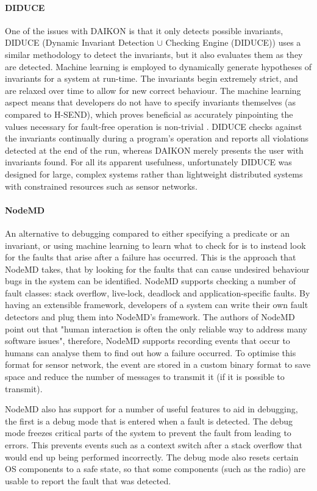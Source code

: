 \paragraph{DIDUCE} One of the issues with DAIKON is that it only detects possible invariants, DIDUCE \cite{diduce} (Dynamic Invariant Detection $\cup$ Checking Engine (DIDUCE)) uses a similar methodology to detect the invariants, but it also evaluates them as they are detected. Machine learning is employed to dynamically generate hypotheses of invariants for a system at run-time. The invariants begin extremely strict, and are relaxed over time to allow for new correct behaviour. The machine learning aspect means that developers do not have to specify invariants themselves (as compared to H-SEND), which proves beneficial as accurately pinpointing the values necessary for fault-free operation is non-trivial \cite{?}. DIDUCE checks against the invariants continually during a program's operation and reports all violations detected at the end of the run, whereas DAIKON merely presents the user with invariants found. For all its apparent usefulness, unfortunately DIDUCE was designed for large, complex systems rather than lightweight distributed systems with constrained resources such as sensor networks.

\paragraph{NodeMD} An alternative to debugging compared to either specifying a predicate or an invariant, or using machine learning to learn what to check for is to instead look for the faults that arise after a failure has occurred. This is the approach that NodeMD \cite{NodeMD} takes, that by looking for the faults that can cause undesired behaviour bugs in the system can be identified. NodeMD supports checking a number of fault classes: stack overflow, live-lock, deadlock and application-specific faults. By having an extensible framework, developers of a system can write their own fault detectors and plug them into NodeMD's framework. The authors of NodeMD point out that "human interaction is often the only reliable way to address many software issues", therefore, NodeMD supports recording events that occur to humans can analyse them to find out how a failure occurred. To optimise this format for sensor network, the event are stored in a custom binary format to save space and reduce the number of messages to transmit it (if it is possible to transmit).

NodeMD also has support for a number of useful features to aid in debugging, the first is a debug mode that is entered when a fault is detected. The debug mode freezes critical parts of the system to prevent the fault from leading to errors. This prevents events such as a context switch after a stack overflow that would end up being performed incorrectly. The debug mode also resets certain OS components to a safe state, so that some components (such as the radio) are usable to report the fault that was detected.

